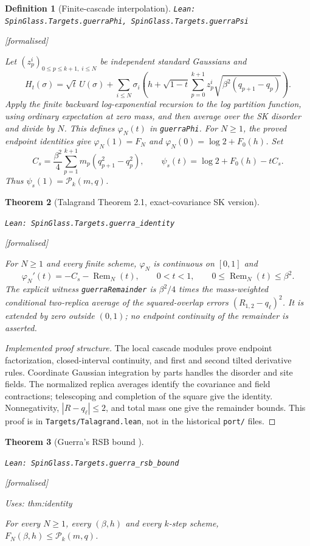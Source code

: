 \documentclass[11pt]{article}
\providecommand{\lean}[1]{\leavevmode\par\nopagebreak
  {\noindent\normalfont\footnotesize\raggedright\texttt{Lean: #1}\par}\nopagebreak}
\providecommand{\leanok}{\par\nopagebreak
  {\noindent\normalfont\footnotesize\textcolor{green!50!black}{[formalised]}\par}\nopagebreak}
\providecommand{\uses}[1]{\par\nopagebreak
  {\noindent\normalfont\footnotesize Uses: #1\par}\nopagebreak}
\newtheorem{theorem}{Theorem}[section]
\newtheorem{definition}[theorem]{Definition}
\begin{document}
\begin{definition}[Finite-cascade interpolation]
\lean{SpinGlass.Targets.guerraPhi, SpinGlass.Targets.guerraPsi}\leanok
Let $(z_p^i)_{0\le p\le k+1,\;i\le N}$ be independent standard Gaussians and
\[
H_t(\sigma)=\sqrt t\,U(\sigma)+\sum_{i\le N}\sigma_i
\left(h+\sqrt{1-t}\sum_{p=0}^{k+1}z^i_p\sqrt{\beta^2(q_{p+1}-q_p)}\right).
\]
Apply the finite backward log-exponential recursion to the log partition function,
using ordinary expectation at zero mass, and then average over the SK disorder
and divide by $N$. This defines $\varphi_N(t)$ in \texttt{guerraPhi}.
For $N\ge1$, the proved endpoint identities give $\varphi_N(1)=F_N$ and
$\varphi_N(0)=\log2+F_0(h)$. Set
\[
C_s=\frac{\beta^2}{4}\sum_{p=1}^{k+1}m_p(q_{p+1}^2-q_p^2),
\qquad \psi_s(t)=\log2+F_0(h)-tC_s .
\]
Thus $\psi_s(1)=\mathcal P_k(m,q)$.
\end{definition}

\begin{theorem}[Talagrand Theorem 2.1, exact-covariance SK version]\label{thm:identity}
\lean{SpinGlass.Targets.guerra\_identity}\leanok
For $N\ge1$ and every finite scheme, $\varphi_N$ is continuous on $[0,1]$ and
\[
\varphi_N'(t)=-C_s-\operatorname{Rem}_N(t), \qquad 0<t<1,
\qquad 0\le\operatorname{Rem}_N(t)\le\beta^2.
\]
The explicit witness \texttt{guerraRemainder} is $\beta^2/4$ times the
mass-weighted conditional two-replica average of the squared-overlap errors
$(R_{1,2}-q_\ell)^2$. It is extended by zero outside $(0,1)$; no endpoint
continuity of the remainder is asserted.
\end{theorem}

\begin{proof}[Implemented proof structure]
The local cascade modules prove endpoint factorization, closed-interval
continuity, and first and second tilted derivative rules. Coordinate Gaussian
integration by parts handles the disorder and site fields. The normalized
replica averages identify the covariance and field contractions; telescoping
and completion of the square give the identity. Nonnegativity, $|R-q_\ell|\le2$,
and total mass one give the remainder bounds. This proof is in
\texttt{Targets/Talagrand.lean}, not in the historical \texttt{port/} files.
\end{proof}

\begin{theorem}[Guerra's RSB bound \cite{Gue03}]\label{thm:guerra}
\lean{SpinGlass.Targets.guerra\_rsb\_bound}\leanok
\uses{thm:identity}
For every $N\ge1$, every $(\beta,h)$ and every $k$-step scheme,
$F_N(\beta,h)\le\mathcal P_k(m,q)$.
\end{theorem}
\end{document}
